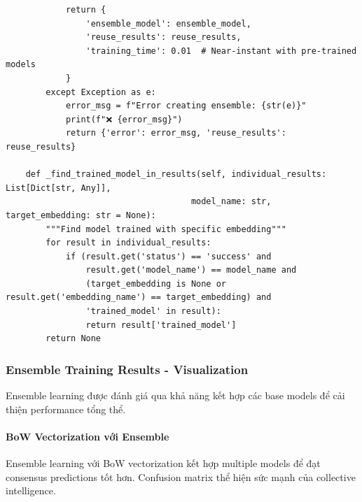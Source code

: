 \begin{verbatim}
            return {
                'ensemble_model': ensemble_model,
                'reuse_results': reuse_results,
                'training_time': 0.01  # Near-instant with pre-trained models
            }
        except Exception as e:
            error_msg = f"Error creating ensemble: {str(e)}"
            print(f"❌ {error_msg}")
            return {'error': error_msg, 'reuse_results': reuse_results}
    
    def _find_trained_model_in_results(self, individual_results: List[Dict[str, Any]], 
                                     model_name: str, target_embedding: str = None):
        """Find model trained with specific embedding"""
        for result in individual_results:
            if (result.get('status') == 'success' and 
                result.get('model_name') == model_name and
                (target_embedding is None or result.get('embedding_name') == target_embedding) and
                'trained_model' in result):
                return result['trained_model']
        return None
\end{verbatim}

\subsubsection{Ensemble Training Results - Visualization}

Ensemble learning được đánh giá qua khả năng kết hợp các base models để cải thiện performance tổng thể.

\paragraph{BoW Vectorization với Ensemble}

Ensemble learning với BoW vectorization kết hợp multiple models để đạt consensus predictions tốt hơn. Confusion matrix thể hiện sức mạnh của collective intelligence.

